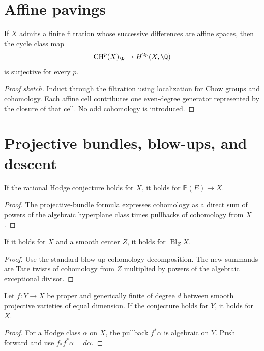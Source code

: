 \section{Affine pavings}
\begin{theorem}
If $X$ admits a finite filtration whose successive differences are affine spaces, then the cycle class map
\[
\CH^p(X)_{\Q}\to H^{2p}(X,\Q)
\]
is surjective for every $p$.
\end{theorem}
\begin{proof}[Proof sketch]
Induct through the filtration using localization for Chow groups and cohomology. Each affine cell contributes one even-degree generator represented by the closure of that cell. No odd cohomology is introduced.
\end{proof}

\section{Projective bundles, blow-ups, and descent}
\begin{proposition}
If the rational Hodge conjecture holds for $X$, it holds for $\mathbb P(E)\to X$.
\end{proposition}
\begin{proof}
The projective-bundle formula expresses cohomology as a direct sum of powers of the algebraic hyperplane class times pullbacks of cohomology from $X$.
\end{proof}

\begin{proposition}
If it holds for $X$ and a smooth center $Z$, it holds for $\operatorname{Bl}_ZX$.
\end{proposition}
\begin{proof}
Use the standard blow-up cohomology decomposition. The new summands are Tate twists of cohomology from $Z$ multiplied by powers of the algebraic exceptional divisor.
\end{proof}

\begin{proposition}
Let $f:Y\to X$ be proper and generically finite of degree $d$ between smooth projective varieties of equal dimension. If the conjecture holds for $Y$, it holds for $X$.
\end{proposition}
\begin{proof}
For a Hodge class $\alpha$ on $X$, the pullback $f^*\alpha$ is algebraic on $Y$. Push forward and use $f_*f^*\alpha=d\alpha$.
\end{proof}




